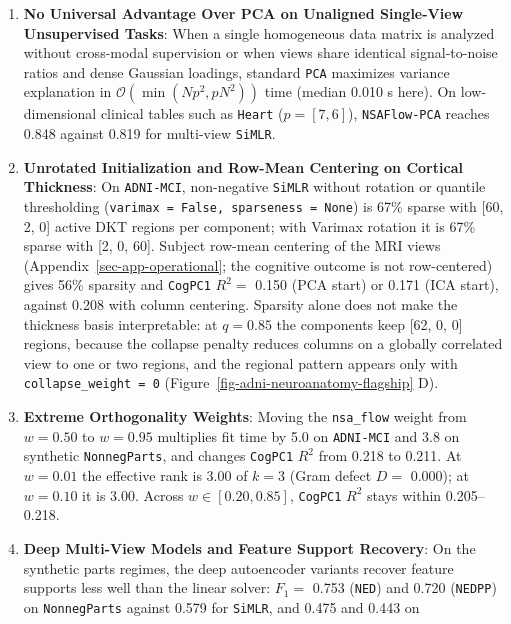 \documentclass[
  10pt,
  letterpaper,
]{report}
\providecommand{\tightlist}{%
  \setlength{\itemsep}{0pt}\setlength{\parskip}{0pt}}
\begin{document}
\begin{enumerate}
\def\labelenumi{\arabic{enumi}.}
\tightlist
\item
  \textbf{No Universal Advantage Over PCA on Unaligned Single-View
  Unsupervised Tasks}: When a single homogeneous data matrix is analyzed
  without cross-modal supervision or when views share identical
  signal-to-noise ratios and dense Gaussian loadings, standard
  \texttt{PCA} maximizes variance explanation in
  \(\mathcal{O}(\min(N p^2, p N^2))\) time (median 0.010 s here). On
  low-dimensional clinical tables such as \texttt{Heart}
  (\(p = [7, 6]\)), \texttt{NSAFlow-PCA} reaches 0.848 against 0.819 for
  multi-view \texttt{SiMLR}.
\item
  \textbf{Unrotated Initialization and Row-Mean Centering on Cortical
  Thickness}: On \texttt{ADNI-MCI}, non-negative \texttt{SiMLR} without
  rotation or quantile thresholding
  (\texttt{varimax\ =\ False,\ sparseness\ =\ None}) is 67\% sparse with
  {[}60, 2, 0{]} active DKT regions per component; with Varimax rotation
  it is 67\% sparse with {[}2, 0, 60{]}. Subject row-mean centering of
  the MRI views (Appendix~\ref{sec-app-operational}; the cognitive
  outcome is not row-centered) gives 56\% sparsity and \texttt{CogPC1}
  \(R^2 =\) 0.150 (PCA start) or 0.171 (ICA start), against 0.208 with
  column centering. Sparsity alone does not make the thickness basis
  interpretable: at \(q = 0.85\) the components keep {[}62, 0, 0{]}
  regions, because the collapse penalty reduces columns on a globally
  correlated view to one or two regions, and the regional pattern
  appears only with \texttt{collapse\_weight\ =\ 0}
  (Figure~\ref{fig-adni-neuroanatomy-flagship} D).
\item
  \textbf{Extreme Orthogonality Weights}: Moving the \texttt{nsa\_flow}
  weight from \(w = 0.50\) to \(w = 0.95\) multiplies fit time by 5.0 on
  \texttt{ADNI-MCI} and 3.8 on synthetic \texttt{NonnegParts}, and
  changes \texttt{CogPC1} \(R^2\) from 0.218 to 0.211. At \(w = 0.01\)
  the effective rank is 3.00 of \(k = 3\) (Gram defect \(D =\) 0.000);
  at \(w = 0.10\) it is 3.00. Across \(w \in [0.20, 0.85]\),
  \texttt{CogPC1} \(R^2\) stays within 0.205--0.218.
\item
  \textbf{Deep Multi-View Models and Feature Support Recovery}: On the
  synthetic parts regimes, the deep autoencoder variants recover feature
  supports less well than the linear solver: \(F_1 =\) 0.753
  (\texttt{NED}) and 0.720 (\texttt{NEDPP}) on \texttt{NonnegParts}
  against 0.579 for \texttt{SiMLR}, and 0.475 and 0.443 on

\end{enumerate}
\end{document}
